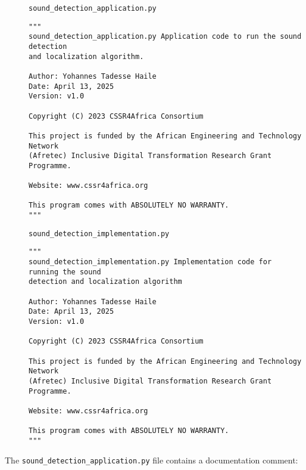 \documentclass{CSSRforAfrica}
\newcommand{\blank}{~\\}
\newcommand{\checkboxChecked}{\fbox{\ding{51}}} %
\begin{document}
\begin{description}

\item[\checkboxChecked] {\small \verb+sound_detection_application.py+}  
{\small \begin{verbatim}
"""
sound_detection_application.py Application code to run the sound detection 
and localization algorithm.

Author: Yohannes Tadesse Haile
Date: April 13, 2025
Version: v1.0

Copyright (C) 2023 CSSR4Africa Consortium

This project is funded by the African Engineering and Technology Network 
(Afretec) Inclusive Digital Transformation Research Grant Programme.

Website: www.cssr4africa.org

This program comes with ABSOLUTELY NO WARRANTY.
"""

\end{verbatim} }

\item[\checkboxChecked]  {\small \verb+sound_detection_implementation.py+}  
{\small \begin{verbatim}
"""
sound_detection_implementation.py Implementation code for running the sound 
detection and localization algorithm

Author: Yohannes Tadesse Haile
Date: April 13, 2025
Version: v1.0

Copyright (C) 2023 CSSR4Africa Consortium

This project is funded by the African Engineering and Technology Network 
(Afretec) Inclusive Digital Transformation Research Grant Programme.

Website: www.cssr4africa.org

This program comes with ABSOLUTELY NO WARRANTY.
"""
\end{verbatim} }



\end{description} 

\newpage
\noindent The {\small \verb+sound_detection_application.py+} file contains a documentation comment:
\end{document}

